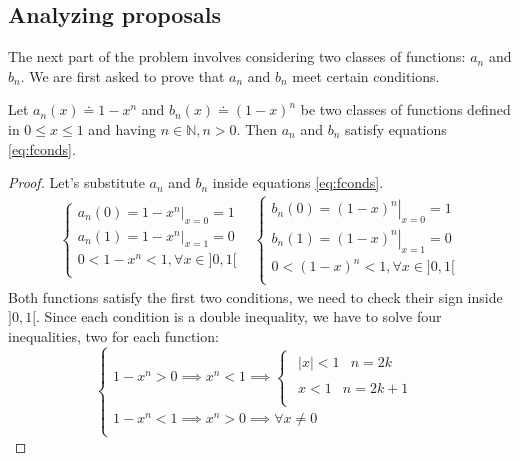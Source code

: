 \subsection{Analyzing proposals}
\label{sec:c1p2}
The next part of the problem involves considering two classes of functions:
$a_n$ and $b_n$. We are first asked to prove that $a_n$ and $b_n$
meet certain conditions.
\begin{proposition}
Let $a_n(x) \doteq 1-x^n$ and $b_n(x) \doteq (1-x)^n$ be two classes of functions 
defined in $0 \leq x \leq 1$ and having $n \in \mathbb{N}, n > 0$. Then
$a_n$ and $b_n$ satisfy equations \ref{eq:fconds}.
\begin{proof}
Let's substitute $a_n$ and $b_n$ inside equations \ref{eq:fconds}.
\begin{equation*}
\begin{matrix}
\begin{cases}
a_n(0) = \left. 1-x^n \right|_{x=0} = 1\\
a_n(1) = \left. 1-x^n \right|_{x=1} = 0\\
0 < 1-x^n < 1, \forall x \in ]0,1[\\
\end{cases} &
\begin{cases}
b_n(0) = \left. (1-x)^n \right|_{x=0} = 1\\
b_n(1) = \left. (1-x)^n \right|_{x=1} = 0\\
0 < (1-x)^n < 1, \forall x \in ]0,1[\\
\end{cases}
\end{matrix}
\end{equation*}
Both functions satisfy the first two conditions, we need to check their sign inside $]0,1[$.
Since each condition is a double inequality, we have to solve four inequalities, two for
each function:
\begin{equation*}
\begin{cases}
1-x^n > 0 \implies x^n < 1 \implies 
\begin{cases}
\begin{matrix}|x| < 1 & n = 2k\end{matrix}\\
\begin{matrix}x < 1 & n = 2k+1\end{matrix}\\
\end{cases}\\
1-x^n < 1 \implies x^n > 0 \implies \forall x \neq 0\\

\end{cases}
\end{equation*}
\end{proof}
\end{proposition}
